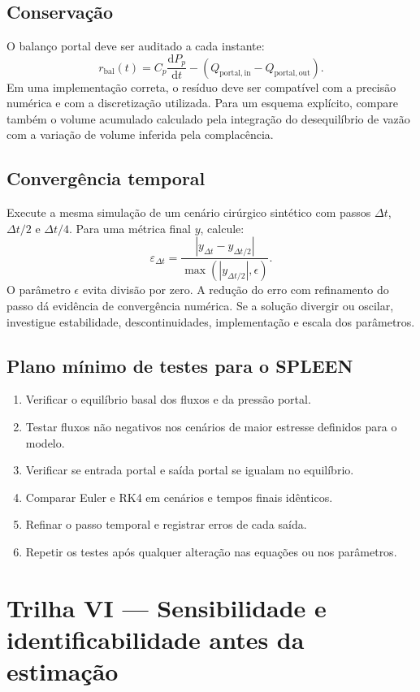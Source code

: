 \documentclass[11pt,a4paper,oneside]{book}
\newcommand{\diff}[2]{\frac{\mathrm{d}#1}{\mathrm{d}#2}}
\newcommand{\Qportin}{Q_{\mathrm{portal,in}}}
\newcommand{\Qportout}{Q_{\mathrm{portal,out}}}
\begin{document}
\section{Conservação}
O balanço portal deve ser auditado a cada instante:
\[
r_{\mathrm{bal}}(t)=
C_p\diff{P_p}{t}-(\Qportin-\Qportout).
\]
Em uma implementação correta, o resíduo deve ser compatível com a precisão numérica e com a discretização utilizada. Para um esquema explícito, compare também o volume acumulado calculado pela integração do desequilíbrio de vazão com a variação de volume inferida pela complacência.

\section{Convergência temporal}
Execute a mesma simulação de um cenário cirúrgico sintético com passos $\Delta t$, $\Delta t/2$ e $\Delta t/4$. Para uma métrica final $y$, calcule:
\[
\varepsilon_{\Delta t}=
\frac{|y_{\Delta t}-y_{\Delta t/2}|}
{\max(|y_{\Delta t/2}|,\epsilon)}.
\]
O parâmetro $\epsilon$ evita divisão por zero. A redução do erro com refinamento do passo dá evidência de convergência numérica. Se a solução divergir ou oscilar, investigue estabilidade, descontinuidades, implementação e escala dos parâmetros.

\section{Plano mínimo de testes para o SPLEEN}
\begin{enumerate}
  \item Verificar o equilíbrio basal dos fluxos e da pressão portal.
  \item Testar fluxos não negativos nos cenários de maior estresse definidos para o modelo.
  \item Verificar se entrada portal e saída portal se igualam no equilíbrio.
  \item Comparar Euler e RK4 em cenários e tempos finais idênticos.
  \item Refinar o passo temporal e registrar erros de cada saída.
  \item Repetir os testes após qualquer alteração nas equações ou nos parâmetros.
\end{enumerate}

\chapter{Trilha VI — Sensibilidade e identificabilidade antes da estimação}
\end{document}
